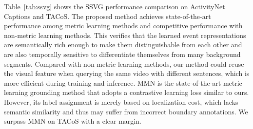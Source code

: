 Table~\ref{tab:ssvg} shows the SSVG performance comparison on ActivityNet Captions and TACoS. The proposed method achieves state-of-the-art performance among metric learning methods and competitive performance with non-metric learning
methods. This verifies that the learned event representations are semantically rich enough to make them distinguishable from each other and are also temporally sensitive to differentiate themselves from many background segments. Compared with non-metric learning methods, our method could reuse the visual feature when querying the same video with different sentences, which is more efficient during training and inference. MMN is the state-of-the-art metric learning grounding method that adopts a contrastive learning loss similar to ours. However, its label assignment is merely based on localization cost, which lacks semantic similarity and thus may suffer from incorrect boundary annotations. We surpass MMN on TACoS  with a clear margin.



